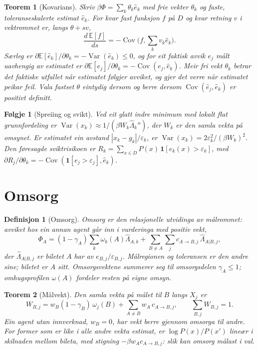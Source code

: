 \documentclass[9pt,twocolumn,a4paper]{article}
\theoremstyle{defstyle}
\newtheorem{definisjon}{Definisjon}
\theoremstyle{formstyle}
\newtheorem{teorem}{Teorem}
\newtheorem{folgje}{Følgje}
\begin{document}
\begin{teorem}[Kovarians]
Skriv $\beta\Phi=\sum_k\theta_k\hat e_k$ med frie vekter $\theta_k$ og faste, toleranseskalerte estimat $\hat e_k$. For kvar fast funksjon $f$ på $D$ og kvar retning $v$ i vektrommet er, langs $\theta+sv$,
\[
\frac{d\,\mathbb{E}[f]}{ds}=-\operatorname{Cov}\bigl(f,\textstyle\sum_k v_k\hat e_k\bigr).
\]
Særleg er $\partial\mathbb{E}[\hat e_k]/\partial\theta_k=-\operatorname{Var}(\hat e_k)\leq 0$, og for eit faktisk avvik $e_j$ målt uavhengig av estimatet er $\partial\mathbb{E}[e_j]/\partial\theta_k=-\operatorname{Cov}(e_j,\hat e_k)$. Meir fri vekt $\theta_k$ betrar det faktiske utfallet når estimatet følgjer avviket, og gjer det verre når estimatet peikar feil. Vala fastset $\theta$ eintydig dersom og berre dersom $\operatorname{Cov}(\hat e_j,\hat e_k)$ er positivt definitt.
\end{teorem}

\begin{folgje}[Spreiing og svikt]
Ved eit glatt indre minimum med lokalt flat grunnfordeling er $\operatorname{Var}(x_k)\approx 1/(\beta W_k\hat\Lambda_k'')$, der $W_k$ er den samla vekta på omsynet. Er estimatet ein avstand $|x_k-g_k|/\varepsilon_k$, er $\operatorname{Var}(x_k)=2\varepsilon_k^2/(\beta W_k)^2$. Den føresagde sviktrisikoen er $R_k=\sum_{x\in D}P(x)\,\mathbf{1}[e_k(x)>\varepsilon_k]$, med $\partial R_j/\partial\theta_k=-\operatorname{Cov}(\mathbf{1}[e_j>\varepsilon_j],\hat e_k)$.
\end{folgje}

\section{Omsorg}

\begin{definisjon}[Omsorg]
Omsorg er den relasjonelle utvidinga av målrommet: avviket hos ein annan agent går inn i vurderinga med positiv vekt,
\[
\Phi_A=(1-\gamma_A)\sum_k\omega_k(A)\hat\Lambda_{A,k}+\sum_{B\neq A}\sum_j c_{A\to B,j}\,\hat\Lambda_{A|B,j},
\]
der $\hat\Lambda_{A|B,j}$ er biletet $A$ har av $e_{B,j}/\varepsilon_{B,j}$. Målregionen og toleransen er den andre sine; biletet er $A$ sitt. Omsorgsvektene summerer seg til omsorgsdelen $\gamma_A\leq 1$; omhugsprofilen $\omega(A)$ fordeler resten på eigne omsyn.
\end{definisjon}

\begin{teorem}[Målvekt]
Den samla vekta på målet til $B$ langs $X_j$ er
\[
W_{B,j}=w_B(1-\gamma_B)\,\omega_j(B)+\sum_{A\neq B}w_A\,c_{A\to B,j},\qquad \sum_{B,j}W_{B,j}=1.
\]
Ein agent utan innverknad, $w_B=0$, har vekt berre gjennom omsorga til andre. For former som er like i alle andre vekta estimat, er $\log P(x)/P(x')$ lineær i skilnaden mellom bileta, med stigning $-\beta w_Ac_{A\to B,j}$: slik kan omsorg målast i val.
\end{teorem}
\end{document}
